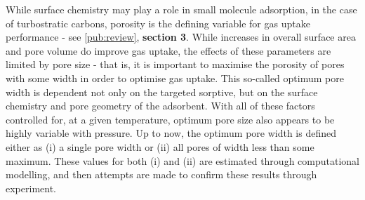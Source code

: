 While surface chemistry may play a role in small molecule \gls{adsorption},\citep{Lueking2004, Li2011a, Li2020Sustainable, wang2012significantly, Botome2017Preparation, liang2013, Kayal2018Activated} in the case of \glspl{turbostratic carbon}, porosity is the defining variable for gas uptake performance\citep{Sevilla2014Energy, Adeniran2016Is, Sevilla2013Assessment, Choi2019Unique, Lee2013Determination, Presser2011Effect, Wickramaratne2013Importance} - see \ref{pub:review}, \textbf{section 3}. While increases in overall surface area and pore volume do improve gas uptake,\citep{Cox2017Ultra, Blankenship2017Cigarette} the effects of these parameters are limited by pore size\citep{Sevilla2014Energy, Sevilla2013Assessment} \citep{Choi2019Unique, Li2019Selective, Cabria2007optimum, Gogotsi2009, Masika2012} - that is, it is important to maximise the porosity of pores with some width in order to optimise gas uptake. This so-called optimum pore width is dependent not only on the targeted sorptive,\citep{Presser2011Effect, Biloe2002Optimal, Cabria2007optimum} but on the surface chemistry\citep{wang2012significantly, Kayal2018Activated, Lueking2004} and pore geometry\citep{Rzepka1998Physisorption, Zhou2004comparative, Hlushak2018Heat} of the \gls{adsorbent}. With all of these factors controlled for, at a given temperature, optimum pore size also appears to be highly variable with pressure.\citep{Presser2011Effect, DelaCasaLillo2002Hydrogen} Up to now, the optimum pore width is defined either as (i) a single pore width\citep{Sevilla2014Energy, Choi2019Unique, Li2019Selective} or (ii) all pores of width less than some maximum.\citep{Biloe2002Optimal, Cabria2007optimum, Presser2011Effect} These values for both (i) and (ii) are estimated through computational modelling,\citep{Biloe2002Optimal, Cabria2007optimum, Hlushak2018Heat} and then attempts are made to confirm these results through experiment.\citep{Choi2019Unique, Presser2011Effect}




